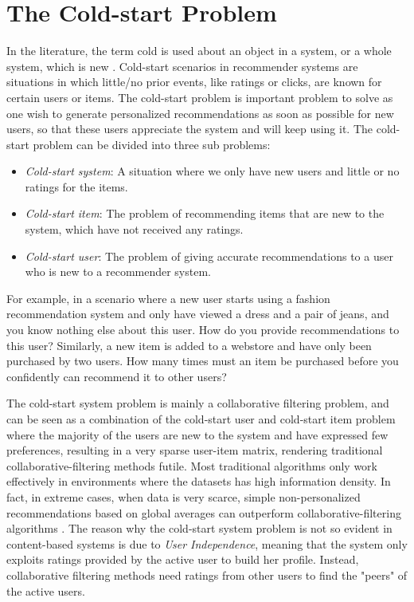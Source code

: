 \section{The Cold-start Problem}


In the literature, the term cold is used about an object in a system, or a
whole system, which is new \cite{Schein2002, Park2006}. Cold-start scenarios in recommender systems are
situations in which little/no prior events, like ratings or clicks, are known
for certain users or items. The cold-start problem is important problem to solve
as one wish to generate personalized recommendations as soon as possible for new users, so
that these users appreciate the system and will keep using it. The cold-start problem
can be divided into three sub problems:

\begin{itemize}
  \item \emph{Cold-start system}: A situation where we only have new users and
  little or no ratings for the items.

  \item \emph{Cold-start item}: The problem of recommending items that are new
  to the system, which have not received any ratings.

  \item \emph{Cold-start user}: The problem of giving accurate recommendations
  to a user who is new to a recommender system.
\end{itemize}

For example, in a scenario where a new user starts using a fashion recommendation
system and only have viewed a dress and a pair of jeans, and you know nothing
else about this user. How do you provide recommendations to this user? Similarly,
a new item is added to a webstore and have only been purchased by two users.
How many times must an item be purchased before you confidently can recommend
it to other users?

The cold-start system problem is mainly a collaborative filtering problem, and
can be seen as a combination of the cold-start user and cold-start item problem
where the majority of the users are new to the system and have expressed few
preferences, resulting in a very sparse user-item matrix, rendering traditional
collaborative-filtering methods futile. Most traditional algorithms only work
effectively in environments where the datasets has high information density. In
fact, in extreme cases, when data is very scarce, simple non-personalized
recommendations based on global averages can outperform collaborative-filtering
algorithms \cite{Park2006}. The reason why the cold-start system problem is not
so evident in content-based systems is due to \emph{User Independence}, meaning
that the system only exploits ratings provided by the active user to build her
profile. Instead, collaborative filtering methods need ratings from other users
to find the "peers" of the active users.

